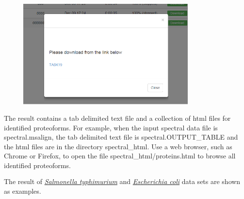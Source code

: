 \documentclass[12pt,letterpaper]{article}
\begin{document}
\begin{figure}[H]
\begin{center}
    \includegraphics[width=0.8\textwidth]{fig/10.png}
\end{center}
\end{figure}

The result contains a tab delimited text file and a collection of html files for identified proteoforms.
For example, when the input spectral data file is spectral.msalign, 
the tab delimited text file is spectral.OUTPUT\_TABLE and 
the html files are in the directory spectral\_html. 
Use a web browser, such as Chrome or Firefox, 
to open the file spectral\_html/proteins.html to browse all identified proteoforms.

The result of 
\href{http://proteomics.informatics.iupui.edu/software/toppic/ST/proteins.html}{\textit{Salmonella typhimurium}} and
\href{http://proteomics.informatics.iupui.edu/software/toppic/EC/proteins.html}{\textit{Escherichia coli}}
data sets are shown as examples.
\end{document}
